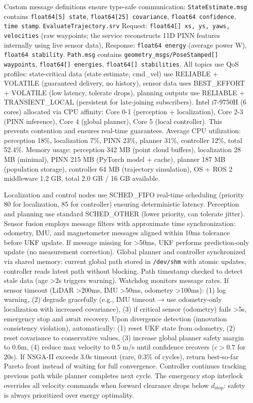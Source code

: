\documentclass[pdflatex,sn-nature]{sn-jnl}%
\begin{document}
Custom message definitions ensure type-safe communication: \texttt{StateEstimate.msg} contains \texttt{float64[5] state}, \texttt{float64[25] covariance}, \texttt{float64 confidence}, \texttt{time stamp}. \texttt{EvaluateTrajectory.srv} Request: \texttt{float64[] xs, ys, yaws, velocities} (raw waypoints; the service reconstructs 11D PINN features internally using live sensor data), Response: \texttt{float64 energy} (average power W), \texttt{float64 stability}. \texttt{Path.msg} contains \texttt{geometry\_msgs/PoseStamped[] waypoints}, \texttt{float64[] energies}, \texttt{float64[] stabilities}. All topics use QoS profiles: state-critical data (state estimate, cmd\_vel) use RELIABLE + VOLATILE (guaranteed delivery, no history), sensor data uses BEST\_EFFORT + VOLATILE (low latency, tolerate drops), planning outputs use RELIABLE + TRANSIENT\_LOCAL (persistent for late-joining subscribers). Intel i7-9750H (6 cores) allocated via CPU affinity: Core 0-1 (perception + localization), Core 2-3 (PINN inference), Core 4 (global planner), Core 5 (local controller). This prevents contention and ensures real-time guarantees. Average CPU utilization: perception 18\%, localization 7\%, PINN 23\%, planner 31\%, controller 12\%, total 52.4\%. Memory usage: perception 342 MB (point cloud buffers), localization 28 MB (minimal), PINN 215 MB (PyTorch model + cache), planner 187 MB (population storage), controller 64 MB (trajectory simulation), OS + ROS 2 middleware 1.2 GB, total 2.0 GB / 16 GB available.

Localization and control nodes use SCHED\_FIFO real-time scheduling (priority 80 for localization, 85 for controller) ensuring deterministic latency. Perception and planning use standard SCHED\_OTHER (lower priority, can tolerate jitter). Sensor fusion employs message filters with approximate time synchronization: odometry, IMU, and magnetometer messages aligned within 10ms tolerance before UKF update. If message missing for >50ms, UKF performs prediction-only update (no measurement correction). Global planner and controller synchronized via shared memory: current global path stored in \texttt{/dev/shm} with atomic updates, controller reads latest path without blocking. Path timestamp checked to detect stale data (age >2s triggers warning). Watchdog monitors message rates. If sensor timeout (LiDAR >200ms, IMU >50ms, odometry >100ms): (1) log warning, (2) degrade gracefully (e.g., IMU timeout → use odometry-only localization with increased covariance), (3) if critical sensor (odometry) fails >5s, emergency stop and await recovery. Upon divergence detection (innovation consistency violation), automatically: (1) reset UKF state from odometry, (2) reset covariance to conservative values, (3) increase global planner safety margin to 0.6m, (4) reduce max velocity to 0.5 m/s until confidence recovers ($c > 0.7$ for 20s). If NSGA-II exceeds 3.0s timeout (rare, 0.3\% of cycles), return best-so-far Pareto front instead of waiting for full convergence. Controller continues tracking previous path while planner completes next cycle. The emergency stop interlock overrides all velocity commands when forward clearance drops below $d_{\mathrm{stop}}$: safety is always prioritized over energy optimality.
\end{document}
